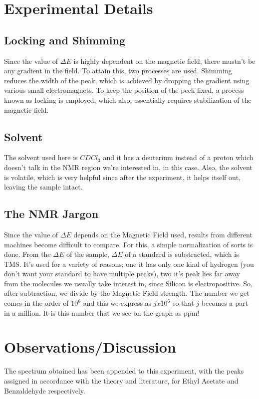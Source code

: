 \section{Experimental Details}
	\subsection{Locking and Shimming}
		Since the value of $\Delta E$ is highly dependent on the magnetic field, there mustn't be any gradient in the field. To attain this, two processes are used. Shimming reduces the width of the peak, which is achieved by dropping the gradient using various small electromagnets. To keep the position of the peek fixed, a process known as locking is employed, which also, essentially requires stabilization of the magnetic field.
	\subsection{Solvent}
		The solvent used here is $CDCl_3$ and it has a deuterium instead of a proton which doesn't talk in the NMR region we're interested in, in this case. Also, the solvent is volatile, which is very helpful since after the experiment, it helps itself out, leaving the sample intact.
	\subsection{The NMR Jargon}
		Since the value of $\Delta E$ depends on the Magnetic Field used, results from different machines become difficult to compare. For this, a simple normalization of sorts is done. From the $\Delta E$ of the sample, $\Delta E$ of a standard is substracted, which is TMS. It's used for a variety of reasons; one it has only one kind of hydrogen (you don't want your standard to have multiple peaks), two it's peak lies far away from the molecules we usually take interest in, since Silicon is electropositive. So, after subtraction, we divide by the Magnetic Field strength. The number we get comes in the order of $10^6$ and this we express as $jx10^6$ so that $j$ becomes a part in a million. It is this number that we see on the graph as ppm! 

\section{Observations/Discussion}
	The spectrum obtained has been appended to this experiment, with the peaks assigned in accordance with the theory and literature, for Ethyl Acetate and Benzaldehyde respectively.


